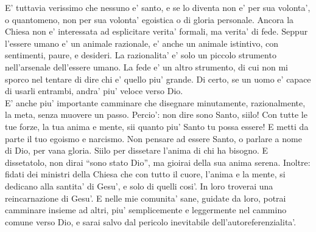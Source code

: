 E' tuttavia verissimo che nessuno e' santo,
e se lo diventa non e' per sua volonta',
o quantomeno, non per sua volonta' egoistica o 
di gloria personale.
Ancora la Chiesa non e' interessata ad esplicitare
verita' formali, ma verita' di fede. Seppur l'essere umano e' un animale razionale, e' anche un animale istintivo, con sentimenti, paure, e desideri. La razionalita' e' solo un piccolo strumento nell'arsenale dell'essere umano. La fede e' un altro strumento, di cui non mi sporco nel tentare di dire chi e' quello piu' grande. Di certo, se un uomo e' capace di usarli entrambi, andra' piu' veloce verso Dio.\\
E' anche piu' importante camminare che disegnare 
minutamente, razionalmente, la meta, senza muovere un passo.
Percio': non dire sono Santo, siilo! 
Con tutte le tue forze, la tua anima e mente, sii 
quanto piu' Santo tu possa essere! E metti
da parte il tuo egoismo e narcismo.
Non pensare ad essere Santo, o parlare a nome di Dio,
per vana gloria. Siilo per dissetare l'anima 
di chi ha bisogno. E dissetatolo, 
non dirai ``sono stato Dio'', ma 
gioirai della sua anima serena.
Inoltre: fidati dei ministri della Chiesa che con tutto
il cuore, l'anima e la mente, si dedicano alla santita'
di Gesu', e solo di quelli cosi'.
In loro troverai una reincarnazione di Gesu'.
E nelle mie comunita' sane, guidate da loro, potrai 
camminare insieme ad altri, piu' semplicemente e
leggermente nel cammino comune verso Dio, 
e sarai salvo dal pericolo inevitabile
dell'autoreferenzialita'.
